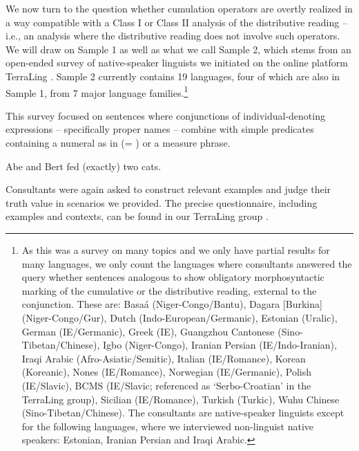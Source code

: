 \documentclass[output=paper]{langscibook}
\begin{document}
We now turn to the question whether cumulation operators are overtly realized in a way compatible with a Class I or Class II analysis of the distributive reading -- i.e., an analysis where the distributive reading does not involve such operators. We will draw on Sample 1 as well as what we call  Sample 2, which stems from an open-ended survey of native-speaker linguists we initiated on the online platform TerraLing \citep{terraling}.
 Sample 2 currently contains 19 languages, four of which are also in Sample 1, from 7 major language families.\footnote{As this was a survey on many topics and we only have partial results for many languages, we only count the languages where consultants answered the query whether sentences analogous to  show obligatory morphosyntactic marking of the cumulative or the distributive reading, external to the conjunction. These are: Basaá (Niger-Congo/Bantu), Dagara [Burkina] (Niger-Congo/Gur), Dutch (Indo-European/Germanic), Estonian (Uralic), German (IE/Germanic), Greek (IE), Guangzhou Cantonese (Sino-Tibetan/Chinese), Igbo (Niger-Congo), Iranian Persian (IE/Indo-Iranian), Iraqi Arabic (Afro-Asiatic/Semitic), Italian (IE/Romance), Korean (Koreanic), Nones (IE/Romance), Norwegian (IE/Germanic), Polish (IE/Slavic), BCMS (IE/Slavic; referenced as `Serbo-Croatian' in the TerraLing group), Sicilian (IE/Romance), Turkish (Turkic), Wuhu Chinese (Sino-Tibetan/Chinese). The consultants are native-speaker linguists except for the following languages, where we interviewed non-linguist native speakers: Estonian, Iranian Persian and Iraqi Arabic.} 

This survey focused  on sentences where conjunctions of individual-denoting expressions -- specifically proper names -- combine with simple predicates containing a numeral as in  (= ) or a measure phrase.

\ea \label{has-sch:110} Abe and Bert fed (exactly) two cats.
\z

\noindent Consultants were again asked to construct relevant examples 
and judge their truth value in scenarios we provided. The precise questionnaire, including examples and contexts, can be found in our TerraLing group \citep{conjunction}.
\end{document}
